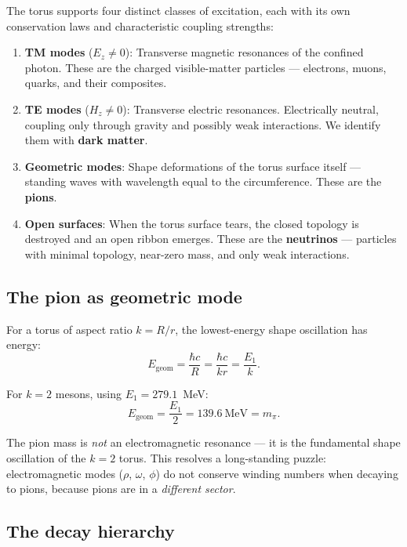 \documentclass[11pt,a4paper]{article}
\begin{document}
The torus supports four distinct classes of excitation, each with its own conservation laws and characteristic coupling strengths:
\begin{enumerate}
  \item \textbf{TM modes} ($E_z \neq 0$): Transverse magnetic resonances of the confined photon. These are the charged visible-matter particles --- electrons, muons, quarks, and their composites.
  \item \textbf{TE modes} ($H_z \neq 0$): Transverse electric resonances. Electrically neutral, coupling only through gravity and possibly weak interactions. We identify them with \textbf{dark matter}.
  \item \textbf{Geometric modes}: Shape deformations of the torus surface itself --- standing waves with wavelength equal to the circumference. These are the \textbf{pions}.
  \item \textbf{Open surfaces}: When the torus surface tears, the closed topology is destroyed and an open ribbon emerges. These are the \textbf{neutrinos} --- particles with minimal topology, near-zero mass, and only weak interactions.
\end{enumerate}

\subsection{The pion as geometric mode}

For a torus of aspect ratio $k = R/r$, the lowest-energy shape oscillation has energy:
\begin{equation}
  E_{\text{geom}} = \frac{\hbar c}{R} = \frac{\hbar c}{kr} = \frac{E_1}{k}.
  \label{eq:pion}
\end{equation}

For $k=2$ mesons, using $E_1 = 279.1$~MeV:
\begin{equation}
  E_{\text{geom}} = \frac{E_1}{2} = 139.6~\text{MeV} = m_\pi.
\end{equation}

The pion mass is \emph{not} an electromagnetic resonance --- it is the fundamental shape oscillation of the $k=2$ torus. This resolves a long-standing puzzle: electromagnetic modes ($\rho$, $\omega$, $\phi$) do not conserve winding numbers when decaying to pions, because pions are in a \emph{different sector}.

\subsection{The decay hierarchy}
\end{document}
